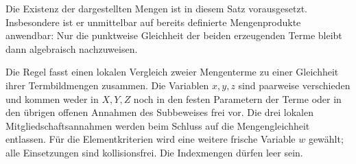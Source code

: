 Die Existenz der dargestellten Mengen ist in diesem Satz vorausgesetzt.
Insbesondere ist er unmittelbar auf bereits definierte Mengenprodukte
anwendbar: Nur die punktweise Gleichheit der beiden erzeugenden Terme
bleibt dann algebraisch nachzuweisen.

\begingroup
{}
\endgroup
Die Regel fasst einen lokalen Vergleich zweier Mengenterme zu einer
Gleichheit ihrer Termbildmengen zusammen. Die Variablen \(x,y,z\)
sind paarweise verschieden und kommen weder in \(X,Y,Z\) noch in den
festen Parametern der Terme oder in den übrigen offenen Annahmen des
Subbeweises frei vor. Die drei lokalen Mitgliedschaftsannahmen werden
beim Schluss auf die Mengengleichheit entlassen. Für die Elementkriterien
wird eine weitere frische Variable \(w\) gewählt; alle Einsetzungen sind
kollisionsfrei. Die Indexmengen dürfen leer sein.
\begin{tabproofwide}
\end{tabproofwide}
